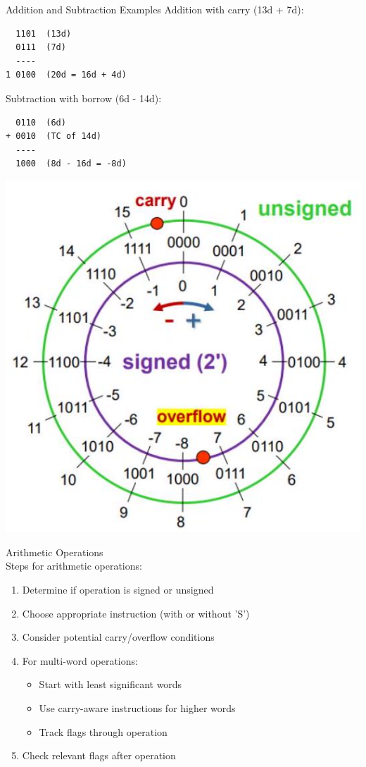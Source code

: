 \begin{example2}{Addition and Subtraction Examples}
Addition with carry (13d + 7d):
\begin{verbatim}
  1101  (13d)
  0111  (7d)
  ----
1 0100  (20d = 16d + 4d)
\end{verbatim}

Subtraction with borrow (6d - 14d):
\begin{verbatim}
  0110  (6d)
+ 0010  (TC of 14d)
  ----
  1000  (8d - 16d = -8d)
\end{verbatim}

\includegraphics[width=\linewidth]{images/2024_12_29_79e6b22f503fb7b4f718g-04(2)}
\end{example2}

\begin{KR}{Arithmetic Operations}\\
Steps for arithmetic operations:
\begin{enumerate}
  \item Determine if operation is signed or unsigned
  \item Choose appropriate instruction (with or without 'S')
  \item Consider potential carry/overflow conditions
  \item For multi-word operations:
    \begin{itemize}
      \item Start with least significant words
      \item Use carry-aware instructions for higher words
      \item Track flags through operation
    \end{itemize}
  \item Check relevant flags after operation
\end{enumerate}
\end{KR}